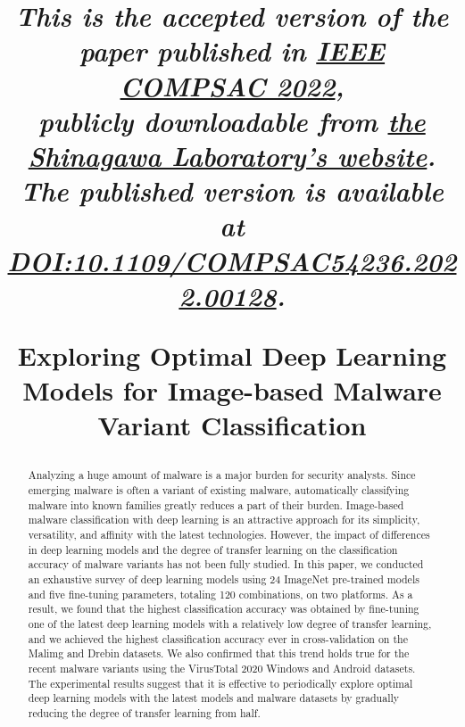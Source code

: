 \documentclass[conference]{IEEEtran}
\newcommand{\doi}{DOI:10.1109/COMPSAC54236.2022.00128}
\newcommand{\doiurl}{https://doi.org/\doi}
\begin{document}
\title{
\begin{spacing}{1}
\normalsize \it
This is the accepted version of the paper published in \href{https://ieeecompsac.computer.org/2022/}{IEEE COMPSAC 2022},\\
publicly downloadable from \href{http://www.os.ecc.u-tokyo.ac.jp}{the Shinagawa Laboratory's website}.\\
The published version is available at \href{\doiurl}{\doi}.
\end{spacing}
\vspace{3ex}
Exploring Optimal Deep Learning Models for Image-based Malware Variant Classification
}

\author{
\and
{}
}

\maketitle

\begin{abstract}
Analyzing a huge amount of malware is a major burden for security analysts.
Since emerging malware is often a variant of existing malware, automatically classifying malware into known families greatly reduces a part of their burden.
Image-based malware classification with deep learning is an attractive approach for its simplicity, versatility, and affinity with the latest technologies.
However, the impact of differences in deep learning models and the degree of transfer learning on the classification accuracy of malware variants has not been fully studied.
In this paper, we conducted an exhaustive survey of deep learning models using 24 ImageNet pre-trained models and five fine-tuning parameters, totaling 120 combinations, on two platforms.
As a result, we found that the highest classification accuracy was obtained by fine-tuning one of the latest deep learning models with a relatively low degree of transfer learning, and we achieved the highest classification accuracy ever in cross-validation on the Malimg and Drebin datasets.
We also confirmed that this trend holds true for the recent malware variants using the VirusTotal 2020 Windows and Android datasets.
The experimental results suggest that it is effective to periodically explore optimal deep learning models with the latest models and malware datasets by gradually reducing the degree of transfer learning from half.
\end{abstract}
\end{document}
